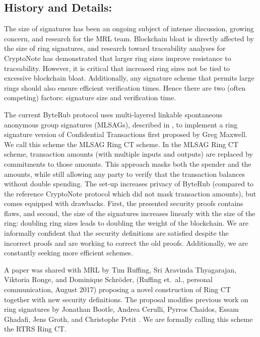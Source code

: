 \documentclass[12pt,english]{mrl}
\theoremstyle{definition}
\numberwithin{equation}{section}
\numberwithin{figure}{section}
\numberwithin{equation}{section}
\numberwithin{equation}{section}
\numberwithin{figure}{section}
\begin{document}
\subsection{History and Details:} 

The size of signatures has been an ongoing subject of intense discussion, growing concern, and research for the MRL team. Blockchain bloat is directly affected by the size of ring signatures, and research toward traceability analyses for CryptoNote has demonstrated that larger ring sizes improve resistance to traceability. However, it is critical that increased ring sizes not be tied to excessive blockchain bloat. Additionally, any signature scheme that permits large rings should also ensure efficient verification times. Hence there are two (often competing) factors: signature size and verification time.

The current ByteRub protocol uses multi-layered linkable spontaneous anonymous group signatures (MLSAGs), described in \cite{noether2016ring}, to implement a ring signature version of Confidential Transactions first proposed by Greg Maxwell. We call this scheme the MLSAG Ring CT scheme. In the MLSAG Ring CT scheme, transaction amounts (with multiple inputs and outputs) are replaced by commitments to those amounts. This approach masks both the spender and the amounts, while still allowing any party to verify that the transaction balances without double spending. The set-up increases privacy of ByteRub (compared to the reference CryptoNote protocol which did not mask transaction amounts), but comes equipped with drawbacks. First, the presented security proofs contains flaws, and second, the size of the signatures increases linearly with the size of the ring: doubling ring sizes leads to doubling the weight of the blockchain.  We are informally confident that the security definitions are satisfied despite the incorrect proofs and are working to correct the old proofs. Additionally, we are constantly seeking more efficient schemes.

A paper was shared with MRL by Tim Ruffing, Sri Aravinda Thyagarajan, Viktoria Ronge, and Dominique Schr{\"o}der, (Ruffing et.\ al., personal communication, August 2017) proposing a novel construction of Ring CT together with new security definitions. The proposal modifies previous work on ring signatures by Jonathan Bootle, Andrea Cerulli, Pyrros Chaidos, Essam Ghadafi, Jens Groth, and Christophe Petit \cite{bootle2015short}. We are formally calling this scheme the RTRS Ring CT.  
\end{document}
